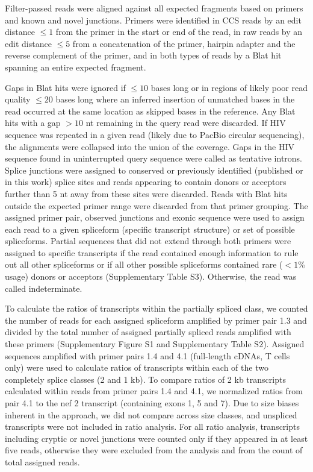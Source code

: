 \documentclass[../sherrill-Mix_thesis.tex]{subfiles}
\begin{document}
Filter-passed reads were aligned against all expected fragments based on primers and known and novel junctions. Primers were identified in CCS reads by an edit distance $\le 1$ from the primer in the start or end of the read, in raw reads by an edit distance $\le 5$ from a concatenation of the primer, hairpin adapter and the reverse complement of the primer, and in both types of reads by a Blat hit spanning an entire expected fragment.

Gaps in Blat hits were ignored if $\le 10$ bases long or in regions of likely poor read quality $\le 20$ bases long where an inferred insertion of unmatched bases in the read occurred at the same location as skipped bases in the reference. Any Blat hits with a gap $>10$ nt remaining in the query read were discarded. If HIV sequence was repeated in a given read (likely due to PacBio circular sequencing), the alignments were collapsed into the union of the coverage. Gaps in the HIV sequence found in uninterrupted query sequence were called as tentative introns. Splice junctions were assigned to conserved or previously identified (published or in this work) splice sites and reads appearing to contain donors or acceptors further than 5 nt away from these sites were discarded. Reads with Blat hits outside the expected primer range were discarded from that primer grouping. The assigned primer pair, observed junctions and exonic sequence were used to assign each read to a given spliceform (specific transcript structure) or set of possible spliceforms. Partial sequences that did not extend through both primers were assigned to specific transcripts if the read contained enough information to rule out all other spliceforms or if all other possible spliceforms contained rare ($<1$\% usage) donors or acceptors (Supplementary Table S3). Otherwise, the read was called indeterminate.

To calculate the ratios of transcripts within the partially spliced class, we counted the number of reads for each assigned spliceform amplified by primer pair 1.3 and divided by the total number of assigned partially spliced reads amplified with these primers (Supplementary Figure S1 and Supplementary Table S2). Assigned sequences amplified with primer pairs 1.4 and 4.1 (full-length cDNAs, T cells only) were used to calculate ratios of transcripts within each of the two completely splice classes (\approximately{}2 and \approximately{}1 kb). To compare ratios of \approximately{}2 kb transcripts calculated within reads from primer pairs 1.4 and 4.1, we normalized ratios from pair 4.1 to the nef 2 transcript (containing exons 1, 5 and 7). Due to size biases inherent in the approach, we did not compare across size classes, and unspliced transcripts were not included in ratio analysis. For all ratio analysis, transcripts including cryptic or novel junctions were counted only if they appeared in at least five reads, otherwise they were excluded from the analysis and from the count of total assigned reads.
\end{document}
